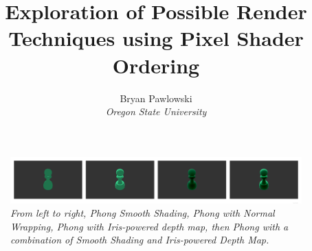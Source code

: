 \documentclass{article}
\title{\fontfamily{phv}\textbf{Exploration of Possible Render Techniques using Pixel Shader Ordering}}
\author{Bryan Pawlowski \\ \textit{Oregon State University}}
\date{}
\begin{document}
\maketitle

\begin{figure}[H]
	\centering
	\includegraphics[width=1.0\textwidth]{ResultPicture.png}
	\caption{\textit{From left to right, Phong Smooth Shading, Phong with Normal Wrapping, Phong with Iris\texttrademark-powered depth map, then Phong with a combination of Smooth Shading and Iris\texttrademark-powered Depth Map.}}
	\label{fig: ResultPhotos}
\end{figure}
\end{document}
